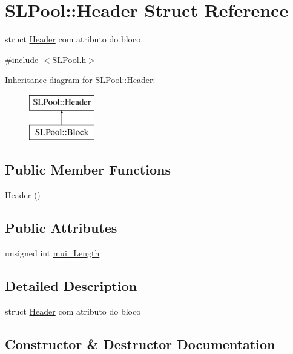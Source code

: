 \hypertarget{struct_s_l_pool_1_1_header}{}\section{S\+L\+Pool\+:\+:Header Struct Reference}
\label{struct_s_l_pool_1_1_header}


struct \hyperlink{struct_s_l_pool_1_1_header}{Header} com atributo do bloco  




{\ttfamily \#include $<$S\+L\+Pool.\+h$>$}

Inheritance diagram for S\+L\+Pool\+:\+:Header\+:\begin{figure}[H]
\begin{center}
\leavevmode
\includegraphics[height=2.000000cm]{struct_s_l_pool_1_1_header}
\end{center}
\end{figure}
\subsection*{Public Member Functions}
\begin{DoxyCompactItemize}
\item 
\hyperlink{struct_s_l_pool_1_1_header_af0a98001b684ebb3ca966a77f23b4d26}{Header} ()
\end{DoxyCompactItemize}
\subsection*{Public Attributes}
\begin{DoxyCompactItemize}
\item 
unsigned int \hyperlink{struct_s_l_pool_1_1_header_a0c06e96d58fa921e35411833364ad264}{mui\+\_\+\+Length}
\end{DoxyCompactItemize}


\subsection{Detailed Description}
struct \hyperlink{struct_s_l_pool_1_1_header}{Header} com atributo do bloco 

\subsection{Constructor \& Destructor Documentation}

